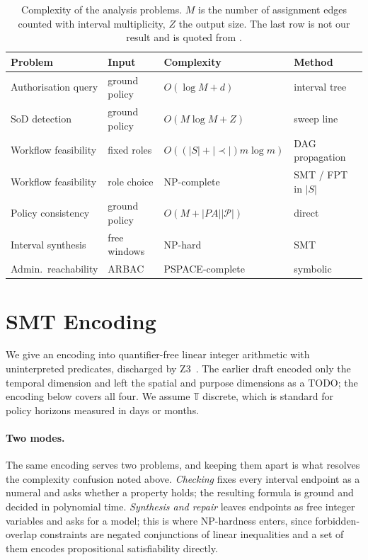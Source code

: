 \documentclass[11pt]{article}
\theoremstyle{definition}
\theoremstyle{plain}
\theoremstyle{remark}
\newcommand{\Tdom}{\mathbb{T}}
\newcommand{\Pdom}{\mathcal{P}}
\begin{document}
\begin{table}[t]
\centering
\caption{Complexity of the analysis problems. $M$ is the number of assignment
edges counted with interval multiplicity, $Z$ the output size. The last row is
not our result and is quoted from \citet{sasturkar2011arbac}.}
\label{tab:complexity}
\small
\begin{tabular}{llll}
\toprule
\textbf{Problem} & \textbf{Input} & \textbf{Complexity} & \textbf{Method} \\
\midrule
Authorisation query   & ground policy & $O(\log M + d)$        & interval tree \\
SoD detection         & ground policy & $O(M\log M + Z)$       & sweep line \\
Workflow feasibility  & fixed roles   & $O((|S|+|{\prec}|)m\log m)$ & DAG propagation \\
Workflow feasibility  & role choice   & NP-complete            & SMT / FPT in $|S|$ \\
Policy consistency    & ground policy & $O(M + |PA||\Pdom|)$   & direct \\
Interval synthesis    & free windows  & NP-hard                & SMT \\
Admin.\ reachability  & ARBAC         & PSPACE-complete        & symbolic \\
\bottomrule
\end{tabular}
\end{table}

\section{SMT Encoding}
\label{sec:smt}

We give an encoding into quantifier-free linear integer arithmetic with
uninterpreted predicates, discharged by Z3~\citep{demoura2008z3}. The earlier
draft encoded only the temporal dimension and left the spatial and purpose
dimensions as a TODO; the encoding below covers all four. We assume $\Tdom$
discrete, which is standard for policy horizons measured in days or months.

\paragraph{Two modes.} The same encoding serves two problems, and keeping them
apart is what resolves the complexity confusion noted above.
\emph{Checking} fixes every interval endpoint as a numeral and asks whether a
property holds; the resulting formula is ground and decided in polynomial time.
\emph{Synthesis and repair} leaves endpoints as free integer variables and asks
for a model; this is where NP-hardness enters, since forbidden-overlap
constraints are negated conjunctions of linear inequalities and a set of them
encodes propositional satisfiability directly.
\end{document}
